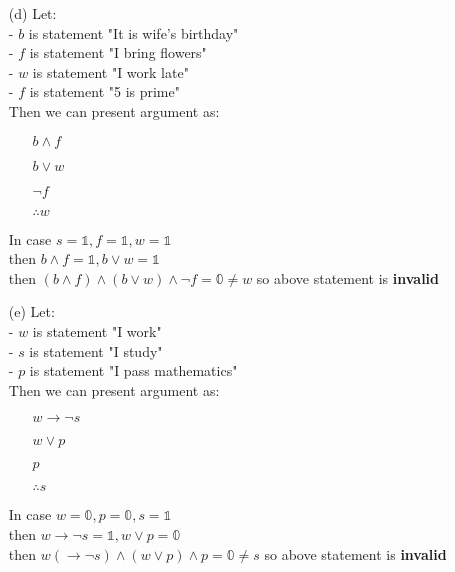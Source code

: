 \begin{enumerate}
    \item[(d)] Let: \\
        - $b$ is statement "It is wife's birthday" \\
        - $f$ is statement "I bring flowers" \\
        - $w$ is statement "I work late" \\
        - $f$ is statement "5 is prime" \\
        Then we can present argument as:
        \begin{enumerate}
            \item[] $b \land f$
            \item[] $b \lor w$
            \item[] $\neg f$
            \item[] $\therefore w$
        \end{enumerate}
        In case $s=\mathbb{1}, f=\mathbb{1}, w=\mathbb{1}$ \\
        then $b\land f = \mathbb{1}, b\lor w = \mathbb{1}$ \\
        then $(b\land f) \land (b\lor w) \land \neg f = \mathbb{0} \neq w$ so above statement is \textbf{invalid}
    
    \newpage
    \item[(e)] Let: \\
        - $w$ is statement "I work" \\
        - $s$ is statement "I study" \\
        - $p$ is statement "I pass mathematics" \\
        Then we can present argument as:
        \begin{enumerate}
            \item[] $w \rightarrow \neg s$
            \item[] $w \lor p$
            \item[] $p$
            \item[] $\therefore s$
        \end{enumerate}
        In case $w=\mathbb{0}, p=\mathbb{0}, s=\mathbb{1}$ \\
        then $w\rightarrow \neg s = \mathbb{1}, w\lor p = \mathbb{0}$ \\
        then $w(\rightarrow \neg s) \land (w\lor p) \land p = \mathbb{0} \neq s$ so above statement is \textbf{invalid}
    

\end{enumerate}
